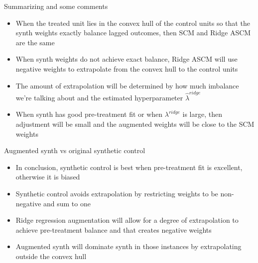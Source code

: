 \documentclass{beamer}
\begin{document}
\begin{frame}{Summarizing and some comments}

\begin{itemize}
\item When the treated unit lies in the convex hull of the control units so that the synth weights exactly balance lagged outcomes, then SCM and Ridge ASCM are the same
\item When synth weights do not achieve exact balance, Ridge ASCM will use negative weights to extrapolate from the convex hull to the control units
\item The amount of extrapolation will be determined by how much imbalance we're talking about and the estimated hyperparameter $\widehat{\lambda}^{ridge}$
\item When synth has good pre-treatment fit or when $\lambda^{ridge}$ is large, then adjustment will be small and the augmented weights will be close to the SCM weights
\end{itemize}

\end{frame}




\begin{frame}{Augmented synth vs original synthetic control}

\begin{itemize}
\item In conclusion, synthetic control is best when pre-treatment fit is excellent, otherwise it is biased
\item Synthetic control avoids extrapolation by restricting weights to be non-negative and sum to one
\item Ridge regression augmentation will allow for a degree of extrapolation to achieve pre-treatment balance and that creates negative weights
\item Augmented synth will dominate synth in those instances by extrapolating outside the convex hull
\end{itemize}

\end{frame}
\end{document}
